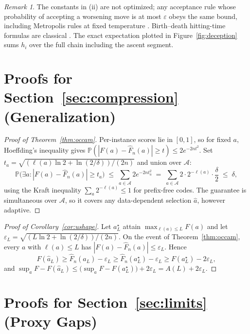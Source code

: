 \documentclass{article}
\theoremstyle{plain}
\theoremstyle{definition}
\theoremstyle{remark}
\newtheorem{remark}[theorem]{Remark}
\newcommand{\A}{\mathcal{A}}
\renewcommand{\P}{\mathbb{P}}
\newcommand{\len}{\ell}
\newcommand{\Fhat}{\widehat{F}}
\newcommand{\eps}{\varepsilon}
\begin{document}
\begin{remark}
The constants in (ii) are not optimized; any acceptance rule whose probability of accepting a worsening move is at most $\eps$ obeys the same bound, including Metropolis rules at fixed temperature \cite{kirkpatrick1983optimization}. Birth--death hitting-time formulas are classical \cite{levin2017markov}. The exact expectation plotted in Figure~\ref{fig:deception} sums $h_i$ over the full chain including the ascent segment.
\end{remark}

\section{Proofs for Section~\ref{sec:compression} (Generalization)}
\label{app:occam}

\begin{proof}[Proof of Theorem~\ref{thm:occam}]
Per-instance scores lie in $[0,1]$, so for fixed $a$, Hoeffding's inequality \cite{hoeffding1963probability} gives $\P(|F(a) - \Fhat_n(a)| \ge t) \le 2e^{-2nt^2}$. Set $t_a = \sqrt{(\len(a)\ln 2 + \ln(2/\delta))/(2n)}$ and union over $\A$:
\[
\P\Big(\exists a : |F(a) - \Fhat_n(a)| \ge t_a\Big)
\;\le\; \sum_{a \in \A} 2 e^{-2n t_a^2}
\;=\; \sum_{a \in \A} 2 \cdot 2^{-\len(a)} \cdot \frac{\delta}{2}
\;\le\; \delta,
\]
using the Kraft inequality $\sum_a 2^{-\len(a)} \le 1$ for prefix-free codes. The guarantee is simultaneous over $\A$, so it covers any data-dependent selection $\hat{a}$, however adaptive.
\end{proof}

\begin{proof}[Proof of Corollary~\ref{cor:ushape}]
Let $a^\star_L$ attain $\max_{\len(a) \le L} F(a)$ and let $\eps_L = \sqrt{(L \ln 2 + \ln(2/\delta))/(2n)}$. On the event of Theorem~\ref{thm:occam}, every $a$ with $\len(a) \le L$ has $|F(a) - \Fhat_n(a)| \le \eps_L$. Hence
\[
F(\hat{a}_L) \ge \Fhat_n(\hat{a}_L) - \eps_L \ge \Fhat_n(a^\star_L) - \eps_L \ge F(a^\star_L) - 2\eps_L ,
\]
and $\sup_a F - F(\hat a_L) \le \big(\sup_a F - F(a^\star_L)\big) + 2\eps_L = A(L) + 2\eps_L$.
\end{proof}

\section{Proofs for Section~\ref{sec:limits} (Proxy Gaps)}
\label{app:goodhart}
\end{document}
